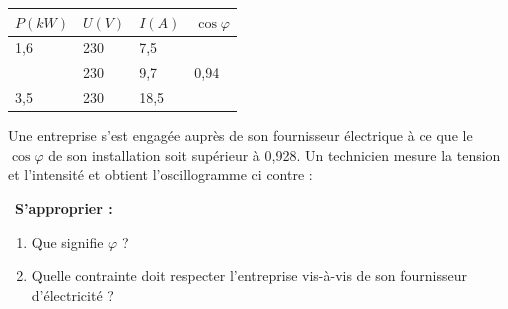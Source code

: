 \documentclass[11pt,a4paper]{article}
\renewcommand{\arraystretch}{2.5}
\begin{document}
\begin{center}

    \renewcommand{\arraystretch}{3}


    \begin{tabular}{|p{3cm}|C{3cm}|C{3cm}|C{3cm}|}
         \hline
      $P (kW)$ &  $U(V)$ & $I (A)$ & $\cos \varphi$\\
         ,6 &  230  & 7,5& \\
         \hline
        & 230 & 9,7 & 0,94 \\
         ,5& 230 & 18,5 & \\
         \hline
         

    \end{tabular}\end{center}

    \vfill 

    \newpage
    


\vspace{3mm}

\noindent%
\begin{minipage}{.59\textwidth}%

Une entreprise s'est engagée auprès de son fournisseur électrique à ce que le $\cos \varphi$ de son installation soit supérieur à 0,928. Un technicien mesure la tension et l'intensité et obtient l'oscillogramme ci contre : 

\end{minipage}%
\hfill
\begin{minipage}{.36\textwidth}%

\osci[%
scale=0.58,
second channel=1,
screen offset one=0,
screen offset two=0,
time div=2.5,
voltage div one=5,
voltage div two=2,
sample rate=200,
xy mode=0,
func one=12*sin(2*180/0.020*x),
func two=3*sin(2*180/0.020*x-45), 
color one=000000,
color two=808080,
graph back color=FFFFFF,
info back color=D6D6D6,
info text color=000000,
main axis color=000000,
grid color=CCCCCC
]


\end{minipage}%

\vfill 

   ~\textbf{S'approprier : }

    \begin{enumerate}
        \item Que signifie $\varphi$ ?  \\
        \vspace{3mm}
        \dotfill 

        \item Quelle contrainte doit respecter l'entreprise vis-à-vis de son fournisseur d'électricité ? \\
           \vspace{3mm}
        \dotfill 
    \end{enumerate} 
    
\end{document}
